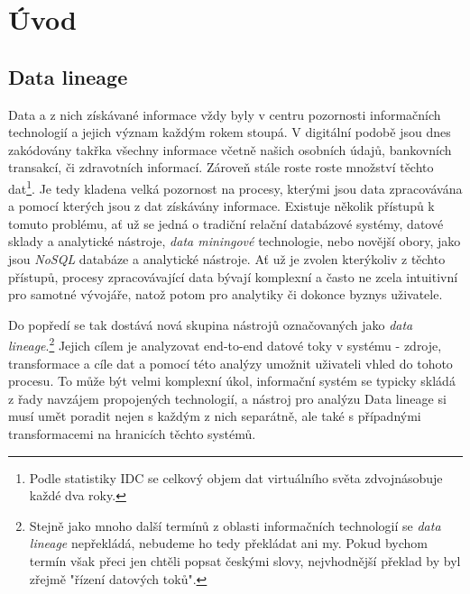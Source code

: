 \chapter{Úvod}
\label{sec:uvod}
\section{Data lineage}

Data a z nich získávané informace vždy byly v centru pozornosti informačních technologií a jejich význam každým rokem stoupá. V digitální podobě jsou dnes zakódovány takřka všechny informace včetně našich osobních údajů, bankovních transakcí, či zdravotních informací. Zároveň stále roste roste množství těchto dat\footnote{Podle statistiky IDC \cite{Idc14} se celkový objem dat virtuálního světa zdvojnásobuje každé dva roky.}.
Je tedy kladena velká pozornost na procesy, kterými jsou data zpracovávána a pomocí kterých jsou z dat získávány informace. Existuje několik přístupů k tomuto problému, ať už se jedná o tradiční relační databázové systémy, datové sklady a \textit{} analytické nástroje, \textit{data miningové} technologie, nebo novější obory, jako jsou \textit{NoSQL} databáze a analytické nástroje. Ať už je zvolen kterýkoliv z těchto přístupů, procesy zpracovávající data bývají komplexní a často ne zcela intuitivní pro samotné vývojáře, natož potom pro analytiky či dokonce byznys uživatele.

Do popředí se tak dostává nová skupina nástrojů označovaných jako \textit{data lineage}.\footnote{Stejně jako mnoho další termínů z oblasti informačních technologií se \textit{data lineage} nepřekládá, nebudeme ho tedy překládat ani my. Pokud bychom termín však přeci jen chtěli popsat českými slovy, nejvhodnější překlad by byl zřejmě "řízení datových toků".}
Jejich cílem je analyzovat end-to-end datové toky v systému - zdroje, transformace a cíle dat a pomocí této analýzy umožnit uživateli vhled do tohoto procesu. To může být velmi komplexní úkol, informační systém se typicky skládá z řady navzájem propojených technologií, a nástroj pro analýzu Data lineage si musí umět poradit nejen s každým z nich separátně, ale také s případnými transformacemi na hranicích těchto systémů.

